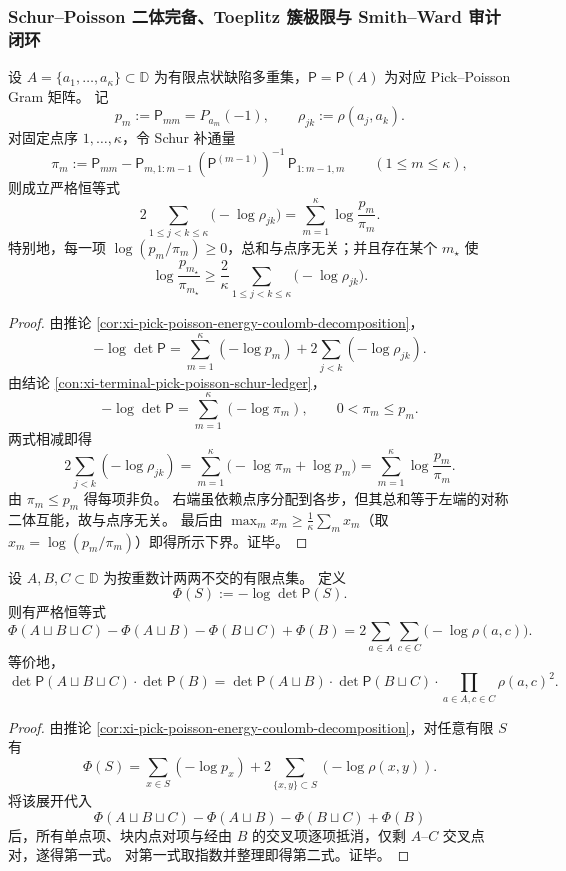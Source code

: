 \subsubsection{Schur--Poisson 二体完备、Toeplitz 簇极限与 Smith--Ward 审计闭环}\label{subsubsec:xi-time-protocol-conclusions-part47}

\begin{theorem}\label{thm:xi-schur-poisson-mutual-energy-ledger-identity}
设 \(A=\{a_1,\dots,a_\kappa\}\subset\mathbb D\) 为有限点状缺陷多重集，\(\mathsf P=\mathsf P(A)\) 为对应 Pick--Poisson Gram 矩阵。
记
\[
p_m:=\mathsf P_{mm}=P_{a_m}(-1),\qquad
\rho_{jk}:=\rho(a_j,a_k).
\]
对固定点序 \(1,\dots,\kappa\)，令 Schur 补通量
\[
\pi_m:=\mathsf P_{mm}-\mathsf P_{m,1:m-1}\,(\mathsf P^{(m-1)})^{-1}\,\mathsf P_{1:m-1,m}\qquad(1\le m\le \kappa),
\]
则成立严格恒等式
\[
2\sum_{1\le j<k\le \kappa}\bigl(-\log\rho_{jk}\bigr)
=\sum_{m=1}^{\kappa}\log\frac{p_m}{\pi_m}.
\]
特别地，每一项 \(\log(p_m/\pi_m)\ge 0\)，总和与点序无关；并且存在某个 \(m_\star\) 使
\[
\log\frac{p_{m_\star}}{\pi_{m_\star}}
\ge
\frac{2}{\kappa}\sum_{1\le j<k\le \kappa}\bigl(-\log\rho_{jk}\bigr).
\]
\end{theorem}
\begin{proof}
由推论 \ref{cor:xi-pick-poisson-energy-coulomb-decomposition}，
\[
-\log\det\mathsf P
=\sum_{m=1}^{\kappa}(-\log p_m)
+2\sum_{j<k}(-\log\rho_{jk}).
\]
由结论 \ref{con:xi-terminal-pick-poisson-schur-ledger}，
\[
-\log\det\mathsf P=\sum_{m=1}^{\kappa}(-\log\pi_m),\qquad 0<\pi_m\le p_m.
\]
两式相减即得
\[
2\sum_{j<k}(-\log\rho_{jk})
=\sum_{m=1}^{\kappa}\bigl(-\log\pi_m+\log p_m\bigr)
=\sum_{m=1}^{\kappa}\log\frac{p_m}{\pi_m}.
\]
由 \(\pi_m\le p_m\) 得每项非负。
右端虽依赖点序分配到各步，但其总和等于左端的对称二体互能，故与点序无关。
最后由 \(\max_m x_m\ge \frac1\kappa\sum_m x_m\)（取 \(x_m=\log(p_m/\pi_m)\)）即得所示下界。证毕。
\end{proof}

\begin{theorem}\label{thm:xi-pick-poisson-three-set-mobius-identity}
设 \(A,B,C\subset\mathbb D\) 为按重数计两两不交的有限点集。
定义
\[
\Phi(S):=-\log\det\mathsf P(S).
\]
则有严格恒等式
\[
\Phi(A\sqcup B\sqcup C)-\Phi(A\sqcup B)-\Phi(B\sqcup C)+\Phi(B)
=2\sum_{a\in A}\sum_{c\in C}\bigl(-\log\rho(a,c)\bigr).
\]
等价地，
\[
\det\mathsf P(A\sqcup B\sqcup C)\cdot \det\mathsf P(B)
=\det\mathsf P(A\sqcup B)\cdot \det\mathsf P(B\sqcup C)\cdot
\prod_{a\in A,c\in C}\rho(a,c)^2.
\]
\end{theorem}
\begin{proof}
由推论 \ref{cor:xi-pick-poisson-energy-coulomb-decomposition}，对任意有限 \(S\) 有
\[
\Phi(S)=\sum_{x\in S}(-\log p_x)+2\sum_{\{x,y\}\subset S}(-\log\rho(x,y)).
\]
将该展开代入
\[
\Phi(A\sqcup B\sqcup C)-\Phi(A\sqcup B)-\Phi(B\sqcup C)+\Phi(B)
\]
后，所有单点项、块内点对项与经由 \(B\) 的交叉项逐项抵消，仅剩 \(A\)--\(C\) 交叉点对，遂得第一式。
对第一式取指数并整理即得第二式。证毕。
\end{proof}


